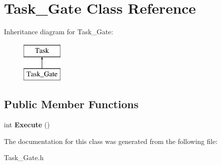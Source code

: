 \hypertarget{classTask__Gate}{\section{\-Task\-\_\-\-Gate \-Class \-Reference}
\label{classTask__Gate}
}
\-Inheritance diagram for \-Task\-\_\-\-Gate\-:\begin{figure}[H]
\begin{center}
\leavevmode
\includegraphics[height=2.000000cm]{classTask__Gate}
\end{center}
\end{figure}
\subsection*{\-Public \-Member \-Functions}
\begin{DoxyCompactItemize}
\item 
\hypertarget{classTask__Gate_a106837a83c62eb560123c91dfed817e9}{int {\bfseries \-Execute} ()}\label{classTask__Gate_a106837a83c62eb560123c91dfed817e9}

\end{DoxyCompactItemize}


\-The documentation for this class was generated from the following file\-:\begin{DoxyCompactItemize}
\item 
\-Task\-\_\-\-Gate.\-h\end{DoxyCompactItemize}
